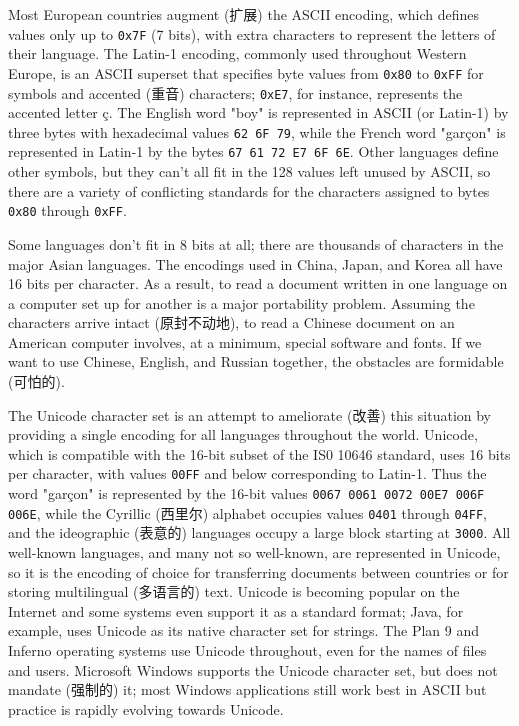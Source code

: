 Most European countries augment (扩展) the ASCII encoding, which defines
values only up to \verb'0x7F' (7 bits), with extra characters to represent
the letters of their language.  The Latin-1 encoding, commonly used
throughout Western Europe, is an ASCII superset that specifies byte values
from \verb'0x80' to \verb'0xFF' for symbols and accented (重音) characters;
\verb'0xE7', for instance, represents the accented letter \c{c}. The
English word "boy" is represented in ASCII (or Latin-1) by three bytes with
hexadecimal values \verb'62 6F 79', while the French word "gar\c{c}on" is
represented in Latin-1 by the bytes \verb'67 61 72 E7 6F 6E'. Other
languages define other symbols, but they can't all fit in the 128 values
left unused by ASCII, so there are a variety of conflicting standards for
the characters assigned to bytes \verb'0x80' through \verb'0xFF'.

Some languages don't fit in 8 bits at all; there are thousands of
characters in the major Asian languages. The encodings used in China,
Japan, and Korea all have 16 bits per character. As a result, to read a
document written in one language on a computer set up for another is a
major portability problem. Assuming the characters arrive intact
(原封不动地), to read a Chinese document on an American computer involves,
at a minimum, special software and fonts. If we want to use Chinese,
English, and Russian together, the obstacles are formidable (可怕的).

The Unicode character set is an attempt to ameliorate (改善) this situation
by providing a single encoding for all languages throughout the world.
Unicode, which is compatible with the 16-bit subset of the IS0 10646
standard, uses 16 bits per character, with values \verb'00FF' and below
corresponding to Latin-1. Thus the word "gar\c{c}on" is represented by the
16-bit values \verb'0067 0061 0072 00E7 006F 006E', while the Cyrillic
(西里尔) alphabet occupies values \verb'0401' through \verb'04FF', and the
ideographic (表意的) languages occupy a large block starting at
\verb'3000'. All well-known languages, and many not so well-known, are
represented in Unicode, so it is the encoding of choice for transferring
documents between countries or for storing multilingual (多语言的) text.
Unicode is becoming popular on the Internet and some systems even support
it as a standard format; Java, for example, uses Unicode as its native
character set for strings. The Plan 9 and Inferno operating systems use
Unicode throughout, even for the names of files and users.  Microsoft
Windows supports the Unicode character set, but does not mandate (强制的)
it; most Windows applications still work best in ASCII but practice is
rapidly evolving towards Unicode.

